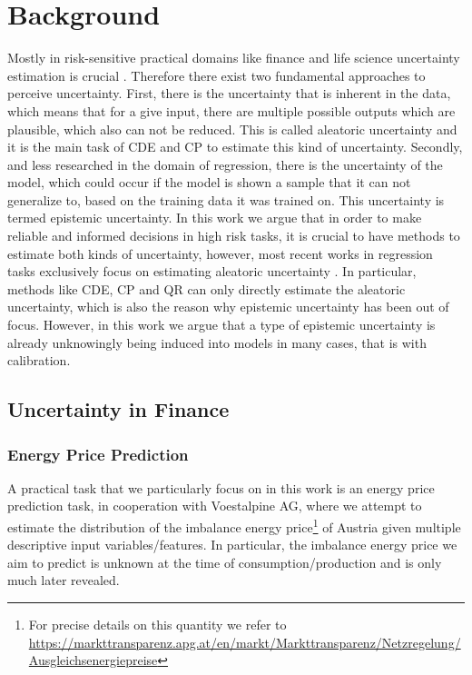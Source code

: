 \section{Background}\label{sec:background}

Mostly in risk-sensitive practical domains like finance and life science uncertainty estimation is crucial \cite{abdar2021review, xia2020uncertainty, ghesu2021quantifying, mashrur2020machine}. Therefore there exist two fundamental approaches to perceive uncertainty. First, there is the uncertainty that is inherent in the data, which means that for a give input, there are multiple possible outputs which are plausible, which also can not be reduced. This is called aleatoric uncertainty and it is the main task of CDE and CP to estimate this kind of uncertainty. Secondly, and less researched in the domain of regression, there is the uncertainty of the model, which could occur if the model is shown a sample that it can not generalize to, based on the training data it was trained on. This uncertainty is termed epistemic uncertainty. In this work we argue that in order to make reliable and informed decisions in high risk tasks, it is crucial to have methods to estimate both kinds of uncertainty, however, most recent works in regression tasks exclusively focus on estimating aleatoric uncertainty \cite{romano2019conformalized, sesia2020comparison, angelopoulos2021gentle,chernozhukov2021distributional,sesia2021conformal, oliveira2022split, romano2022conformal, izbicki2022cd, gupta2022nested, auer2024conformal}. In particular, methods like CDE, CP and QR can only directly estimate the aleatoric uncertainty, which is also the reason why epistemic uncertainty has been out of focus. However, in this work we argue that a type of epistemic uncertainty is already unknowingly being induced into models in many cases, that is with calibration.

\subsection{Uncertainty in Finance}\label{sec:intro_finance}

\subsubsection{Energy Price Prediction}

A practical task that we particularly focus on in this work is an energy price prediction task, in cooperation with Voestalpine AG, where we attempt to estimate the distribution of the imbalance energy price\footnote{For precise details on this quantity we refer to \url{https://markttransparenz.apg.at/en/markt/Markttransparenz/Netzregelung/Ausgleichsenergiepreise}} of Austria given multiple descriptive input variables/features. In particular, the imbalance energy price we aim to predict is unknown at the time of consumption/production and is only much later revealed.

